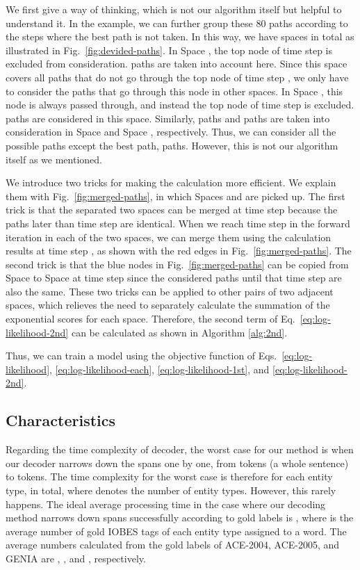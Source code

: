 \documentclass[11pt,a4paper]{article}
\def\figref#1{Fig.~\ref{#1}}
\def\equref#1{Eq.~\ref{#1}}
\begin{document}
We first give a way of thinking, which is not our algorithm itself but helpful to understand it.
In the example, we can further group these 80 paths according to the steps where the best path is not taken.
In this way, we have  spaces in total as illustrated in \figref{fig:devided-paths}.
In Space , the top node of time step  is excluded from consideration.
 paths are taken into account here.
Since this space covers all paths that do not go through the top node of time step , we only have to consider the paths that go through this node in other spaces.
In Space , this node is always passed through, and instead the top node of time step  is excluded. 
 paths are considered in this space.
Similarly,  paths and  paths are taken into consideration in Space  and Space , respectively.
Thus, we can consider all the possible paths except the best path,  paths.
However, this is not our algorithm itself as we mentioned.

We introduce two tricks for making the calculation more efficient.
We explain them with \figref{fig:merged-paths}, in which Spaces  and  are picked up.
The first trick is that the separated two spaces can be merged at time step  because the paths later than time step  are identical.
When we reach time step  in the forward iteration in each of the two spaces, we can merge them using the calculation results at time step , as shown with the red edges in \figref{fig:merged-paths}.
The second trick is that the blue nodes in \figref{fig:merged-paths} can be copied from Space  to Space  at time step  since the considered paths until that time step are also the same.
These two tricks can be applied to other pairs of two adjacent spaces, which relieves the need to separately calculate the summation of the exponential scores for each space.
Therefore, the second term of \equref{eq:log-likelihood-2nd} can be calculated as shown in Algorithm \ref{alg:2nd}.

Thus, we can train a model using the objective function of Eqs.~\ref{eq:log-likelihood}, \ref{eq:log-likelihood-each}, \ref{eq:log-likelihood-1st}, and \ref{eq:log-likelihood-2nd}.

\subsection{Characteristics}

Regarding the time complexity of decoder, the worst case for our method is when our decoder narrows down the spans one by one, from  tokens (a whole sentence) to  tokens.
The time complexity for the worst case is therefore  for each entity type,  in total, where  denotes the number of entity types.
However, this rarely happens.
The ideal average processing time in the case where our decoding method narrows down spans successfully according to gold labels is , where  is the average number of gold IOBES tags of each entity type assigned to a word.
The average numbers calculated from the gold labels of ACE-2004, ACE-2005, and GENIA are , , and , respectively.
\end{document}

